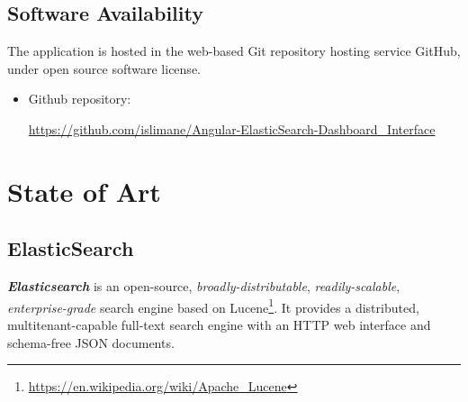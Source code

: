 \documentclass[a4paper, 12pt, english]{book}
\begin{document}





\section{Software Availability}
\label{sec:software-availability}
The application is hosted in the web-based Git repository hosting service GitHub, under open source software license.
\begin{itemize}
    \item Github repository:

    \url{https://github.com/islimane/Angular-ElasticSearch-Dashboard_Interface}
\end{itemize}




\cleardoublepage %
\chapter{State of Art} %
\label{chap:state-of-art} %

\section{ElasticSearch} %
\label{sec:elasticsearch} %

\textit{\textbf{Elasticsearch}} is an open-source, \textit{broadly-distributable}, \textit{readily-scalable}, \textit{enterprise-grade} search engine based on Lucene\footnote{\url{https://en.wikipedia.org/wiki/Apache\_Lucene}}. It provides a distributed, multitenant-capable full-text search engine with an HTTP web interface and schema-free JSON documents.
\end{document}
